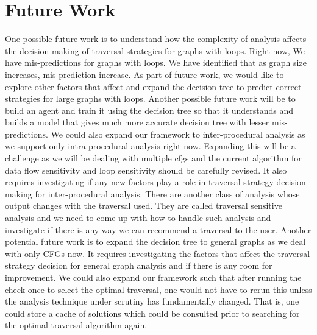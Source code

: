 \section{Future Work}
One possible future work is to understand how the complexity of analysis affects the decision making of traversal strategies for graphs with loops. Right now, We have mis-predictions for graphs with loops. We have identified that as graph size increases, mis-prediction increase. As part of future work, we would like to explore other factors that affect and expand the decision tree to predict correct strategies for large graphs with loops.\newline
Another possible future work will be to build an agent and train it using the decision tree so that it understands and builds a model that gives much more accurate decision tree with lesser mis-predictions.\newline
We could also expand our framework to inter-procedural analysis as we support only intra-procedural analysis right now. Expanding this will be a challenge as we will be dealing with multiple cfgs and the current algorithm for data flow sensitivity and loop sensitivity should be carefully revised. It also requires investigating if any new factors play a role in traversal strategy decision making for inter-procedural analysis.\newline 
There are another class of analysis whose output changes with the traversal used. They are called traversal sensitive analysis and we need to come up with how to handle such analysis and investigate if there is any way we can recommend a traversal to the user.\newline
Another potential future work is to expand the decision tree to general graphs as we deal with only CFGs now. It requires investigating the factors that affect the traversal strategy decision for general graph analysis and if there is any room for improvement.\newline
We could also expand our framework such that after running the check once to select the optimal traversal, one would not have to rerun this unless the analysis technique under scrutiny has fundamentally changed. That is, one could store a cache of solutions which could be consulted prior to searching for the optimal traversal algorithm again.
